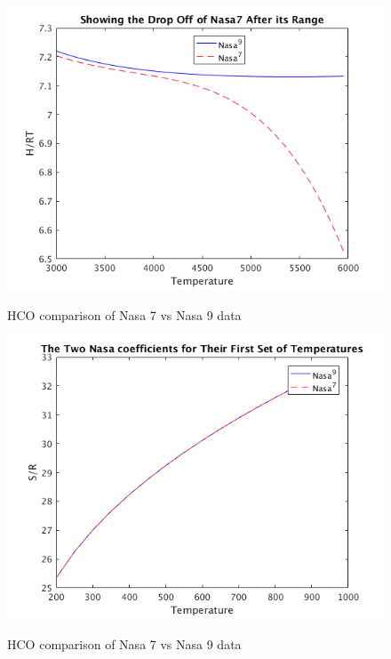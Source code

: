 \documentclass{article}
\begin{document}
\begin{figure}
  \centering
  \includegraphics[width=\textwidth]{H3.png}
  \label{fig:H3}
  \caption{HCO comparison of Nasa 7 vs Nasa 9 data}
\end{figure}


\begin{figure}
  \centering
  \includegraphics[width=\textwidth]{S1.png}
  \label{fig:s1}
  \caption{HCO comparison of Nasa 7 vs Nasa 9 data}
\end{figure}
\end{document}
